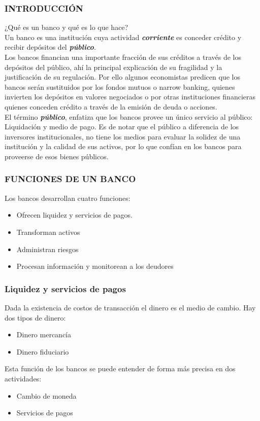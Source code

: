 \begin{frame}
	\frametitle{{\normalsize INTRODUCCIÓN} {}}
	\setcounter{equation}{0}
	¿Qué es un banco y qué es lo que hace?\\
    Un banco es una institución cuya actividad {\bf\emph{corriente}} es conceder crédito y recibir depósitos del {\bf\emph{público}}. \\
    Los bancos financian una importante fracción de sus créditos a través de los depósitos del público, ahí la principal explicación de su fragilidad y la justificación de su regulación. Por ello algunos economistas predicen que los bancos serán sustituidos por los fondos mutuos o narrow banking, quienes invierten los depósitos en valores negociados o por otras instituciones financieras quienes conceden crédito a través de la emisión de deuda o acciones.\\
    El término {\bf\emph{público}}, enfatiza que los bancos provee un único servicio al público: Liquidación y medio de pago. Es de notar que el público a diferencia de los inversores institucionales, no tiene los medios para evaluar la solidez de una institución y la calidad de sus activos, por lo que confían en los bancos para proveerse de esos bienes públicos. 
     
    
    	
\end{frame}

\begin{frame}
    \frametitle{{\normalsize FUNCIONES DE UN BANCO} {}}
   Los bancos desarrollan cuatro funciones:
   \begin{itemize}
       \item Ofrecen liquidez y servicios de pagos.
       \item Transforman activos
       \item Administran riesgos
       \item Procesan información y monitorean a los deudores
   \end{itemize}    
\end{frame}

\begin{frame}
    \frametitle{{\normalsize Liquidez y servicios de pagos} {}}
    Dada la existencia de costos de transacción el dinero es el medio de cambio. Hay dos tipos de dinero:
    \begin{itemize}
        \item Dinero mercancía 
        \item Dinero fiduciario
    \end{itemize}
    Esta función de los bancos se puede entender de forma más precisa en dos actividades:
    \begin{itemize}
        \item Cambio de moneda
        \item Servicios de pagos
    \end{itemize}
\end{frame}

